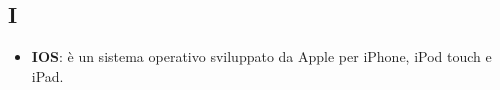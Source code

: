 \subsection{I}
\begin{itemize}
	\item \textbf{IOS}: è un sistema operativo sviluppato da Apple per iPhone, iPod touch e iPad.
\end{itemize}